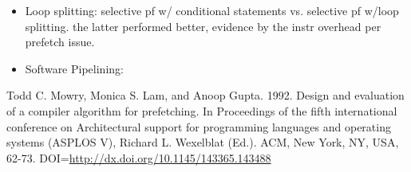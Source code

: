 \documentclass [12pt]{article}
\begin{document}
\begin{itemize}
\begin{itemize}
                    \item Loop splitting: selective pf w/ conditional statements vs. selective pf w/loop splitting. the latter performed better, evidence by the instr overhead per prefetch issue. 
                    \item Software Pipelining: 
                \end{itemize}
        \end{itemize}

\begin{thebibliography}{1}
    Todd C. Mowry, Monica S. Lam, and Anoop Gupta. 1992. Design and evaluation of a compiler algorithm for prefetching. In Proceedings of the fifth international conference on Architectural support for programming languages and operating systems (ASPLOS V), Richard L. Wexelblat (Ed.). ACM, New York, NY, USA, 62-73. DOI=\url{http://dx.doi.org/10.1145/143365.143488}
\end{thebibliography}
\end{document}
